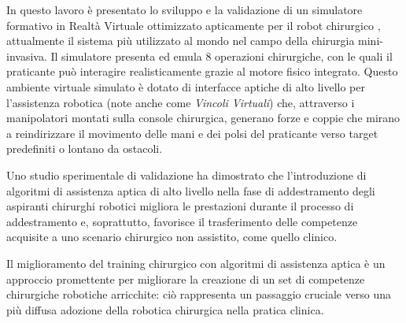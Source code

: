 \documentclass[../main.tex]{subfiles}
\begin{document}
In questo lavoro è presentato lo sviluppo e la validazione di un simulatore formativo in Realtà Virtuale ottimizzato apticamente per il robot chirurgico \davinci, attualmente il sistema più utilizzato al mondo nel campo della chirurgia mini-invasiva. Il simulatore presenta ed emula 8 operazioni chirurgiche, con le quali il praticante può interagire realisticamente grazie al motore fisico integrato. Questo ambiente virtuale simulato è dotato di interfacce aptiche di alto livello per l'assistenza robotica (note anche come \textit{Vincoli Virtuali}) che, attraverso i manipolatori montati sulla console chirurgica, generano forze e coppie che mirano a reindirizzare il movimento delle mani e dei polsi del praticante verso target predefiniti o lontano da ostacoli. 

Uno studio sperimentale di validazione ha dimostrato che l'introduzione di algoritmi di assistenza aptica di alto livello nella fase di addestramento degli aspiranti chirurghi robotici migliora le prestazioni durante il processo di addestramento e, soprattutto, favorisce il trasferimento delle competenze acquisite a uno scenario chirurgico non assistito, come quello clinico. 

Il miglioramento del training chirurgico con algoritmi di assistenza aptica è un approccio promettente per migliorare la creazione di un set di competenze chirurgiche robotiche arricchite: ciò rappresenta un passaggio cruciale verso una più diffusa adozione della robotica chirurgica nella pratica clinica.
\end{document}
